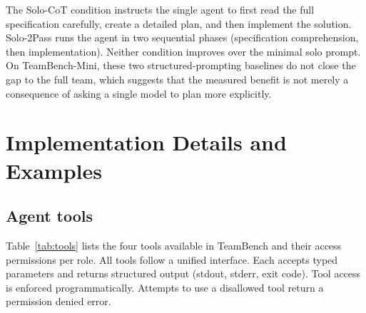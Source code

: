 \documentclass{article}
\begin{document}
The Solo-CoT condition instructs the single agent to first read the full specification carefully, create a detailed plan, and then implement the solution. Solo-2Pass runs the agent in two sequential phases (specification comprehension, then implementation). Neither condition improves over the minimal solo prompt. On TeamBench-Mini, these two structured-prompting baselines do not close the gap to the full team, which suggests that the measured benefit is not merely a consequence of asking a single model to plan more explicitly.


\section{Implementation Details and Examples}
\label{app:impl-details}

\subsection{Agent tools}
\label{app:tools}

Table~\ref{tab:tools} lists the four tools available in TeamBench and their access permissions per role. All tools follow a unified interface. Each accepts typed parameters and returns structured output (stdout, stderr, exit code). Tool access is enforced programmatically. Attempts to use a disallowed tool return a permission denied error.
\end{document}
